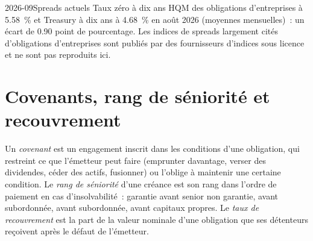 \begin{omfigure}

\label{fig:m2:corporate-bonds:hqm}
\end{omfigure}

\begin{dated}{2026-09}{Spreads actuels}\label{dat:m2:corporate-bonds:spreads}
Taux zéro à dix ans HQM des obligations d'entreprises à 5.58~\% et Treasury à dix ans à 4.68~\% en août 2026
(moyennes mensuelles)~: un écart de 0.90 point de pourcentage. Les indices de spreads largement cités
d'obligations d'entreprises sont publiés par des fournisseurs d'indices sous licence et ne sont pas
reproduits ici.
\end{dated}

\section{Covenants, rang de séniorité et recouvrement}

\begin{definition}\label{def:m2:corporate-bonds:covenant}
Un \emph{covenant} est un engagement inscrit dans les conditions d'une obligation, qui restreint ce que
l'émetteur peut faire (emprunter davantage, verser des dividendes, céder des actifs, fusionner) ou l'oblige
à maintenir une certaine condition. Le \emph{rang de séniorité} d'une créance est son rang dans
l'ordre de paiement en cas d'insolvabilité~: garantie avant senior non garantie, avant subordonnée, avant
subordonnée, avant capitaux propres. Le \emph{taux de recouvrement} est la part
de la valeur nominale d'une obligation que ses détenteurs reçoivent après le défaut de l'émetteur.
\end{definition}

